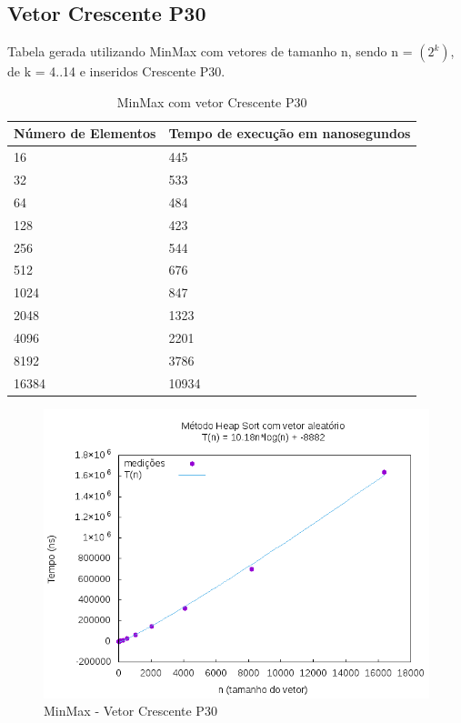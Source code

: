 \documentclass[12pt,a4paper,twoside]{report}
\begin{document}
\subsection{Vetor Crescente P30}
Tabela gerada utilizando MinMax com vetores de tamanho n, sendo n = $(2^k)$, de k = 4..14 e inseridos Crescente P30.
\begin{table}[H]
\centering
\caption{MinMax com vetor Crescente P30}
\label{my-label}
\begin{tabular}{|l|l|}
\hline
\multicolumn{1}{|c|}{\textbf{Número de Elementos}} & \multicolumn{1}{c|}{\textbf{Tempo de execução em nanosegundos}} \\ \hline
16 & 445 \\ \hline
32 & 533 \\ \hline
64 & 484 \\ \hline
128 & 423 \\ \hline
256 & 544 \\ \hline
512 & 676 \\ \hline
1024 & 847 \\ \hline
2048 & 1323 \\ \hline
4096 & 2201 \\ \hline
8192 & 3786 \\ \hline
16384 & 10934 \\ \hline
\end{tabular}
\end{table}

\begin{figure}[H]
    \centering
    \includegraphics[width=0.7\linewidth]{graficos/HeapSort/vIntAleatorio/vIntAleatorio.png}
  \caption{MinMax - Vetor Crescente P30}
\end{figure}
\end{document}
